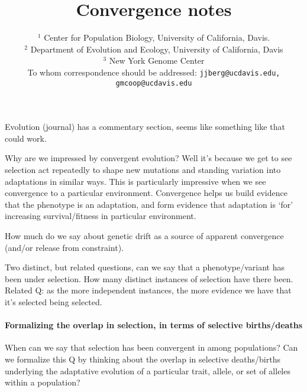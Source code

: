 \documentclass[a4paper,10pt]{article}
\begin{document}
\title{Convergence notes}

\author{
$^1$ Center for Population Biology, University of California, Davis.\\
$^2$ Department of Evolution and Ecology, University of California, Davis\\
$^3$ New York Genome Center\\
\small To whom correspondence should be addressed: \texttt{jjberg@ucdavis.edu, gmcoop@ucdavis.edu}\\
}

\maketitle

Evolution (journal) has a commentary section, seems like something like that could work.

Why are we impressed by convergent evolution? Well it's because we get
to see selection act repeatedly to shape new mutations and standing
variation into adaptations in similar ways. This is particularly
impressive when we see convergence to a particular environment. Convergence helps us build
evidence that the phenotype is an adaptation, and form evidence that
adaptation is `for' increasing survival/fitness in particular
environment. 

How much do we say about genetic drift as a source of apparent convergence (and/or release from constraint).

Two distinct, but related questions, can we say that a phenotype/variant has been under selection. How many distinct instances of selection have there been. 
Related Q: as the more independent instances, the more evidence we have that it's
selected being selected.  

\paragraph{Formalizing the overlap in selection, in terms of selective
births/deaths}
When can we say that selection has been convergent in among populations?
Can we formalize this Q by thinking about the overlap in selective
deaths/births underlying the adaptative evolution of a particular trait, allele, or set of alleles within a population?
\end{document}
